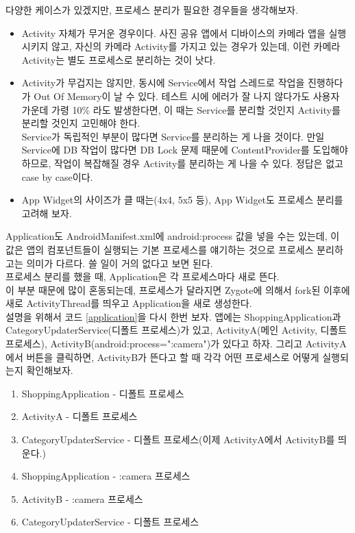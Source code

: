 다양한 케이스가 있겠지만, 프로세스 분리가 필요한 경우들을 생각해보자.
\begin{itemize}
\item Activity 자체가 무거운 경우이다. 사진 공유 앱에서 디바이스의 카메라 앱을 실행시키지 않고, 자신의 카메라 Activity를 가지고 있는 경우가 있는데, 이런 카메라 Activity는 별도 프로세스로 분리하는 것이 낫다.
\item Activity가 무겁지는 않지만, 동시에 Service에서 작업 스레드로 작업을 진행하다가 Out Of Memory이 날 수 있다. 테스트 시에 에러가 잘 나지 않다가도 사용자 가운데 가령 10\% 라도 발생한다면, 이 때는 Service를 분리할 것인지 Activity를 분리할 것인지 고민해야 한다.\\
Service가 독립적인 부분이 많다면 Service를 분리하는 게 나을 것이다. 만일 Service에 DB 작업이 많다면 DB Lock 문제 때문에 ContentProvider를 도입해야 하므로, 작업이 복잡해질 경우 Activity를 분리하는 게 나을 수 있다. 정답은 없고 case by case이다.
\item App Widget의 사이즈가 클 때는(4x4, 5x5 등), App Widget도 프로세스 분리를 고려해 보자.
\end{itemize}

Application도 AndroidManifest.xml에 android:process 값을 넣을 수는 있는데, 이 값은 앱의 컴포넌트들이 실행되는 기본 프로세스를 얘기하는 것으로 프로세스 분리하고는 의미가 다르다. 쓸 일이 거의 없다고 보면 된다.\\

프로세스 분리를 했을 때, Application은 각 프로세스마다 새로 뜬다.\\
이 부분 때문에 많이 혼동되는데, 프로세스가 달라지면 Zygote에 의해서 fork된 이후에 새로 ActivityThread를 띄우고 Application을 새로 생성한다.\\

설명을 위해서 코드 \ref{application}을 다시 한번 보자. 앱에는 ShoppingApplication과 CategoryUpdaterService(디폴트 프로세스)가 있고, ActivityA(메인 Activity, 디폴트 프로세스), ActivityB(android:process=":camera")가 있다고 하자. 그리고 ActivityA에서 버튼을 클릭하면, ActivityB가 뜬다고 할 때 각각 어떤 프로세스로 어떻게 실행되는지 확인해보자.

\begin{enumerate}
\item ShoppingApplication - 디폴트 프로세스
\item ActivityA - 디폴트 프로세스
\item CategoryUpdaterService - 디폴트 프로세스(이제 ActivityA에서 ActivityB를 띄운다.)
\item ShoppingApplication - :camera 프로세스
\item ActivityB - :camera 프로세스
\item CategoryUpdaterService - 디폴트 프로세스
\end{enumerate}

